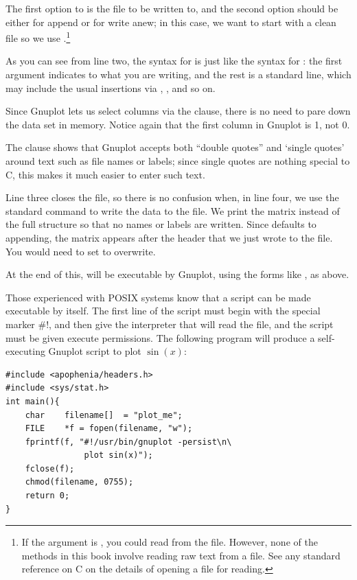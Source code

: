 The first option to  is the file to be written to, and
the second option should be either  for append or  for
write anew; in this case, we want to start with a clean file so we use
.\footnote{If the argument is , you could read from the
file. However, none of the methods in this book involve reading raw text
from a file. See any standard reference on C on the details of opening a
file for reading.} 


As you can see from line two, the syntax for  is just like
the syntax for : the first argument indicates to what you
are writing, and the rest is a standard  line, which may
include the usual insertions via , , and so on.

Since Gnuplot lets us select columns via the  clause, there
is no need to pare down the data set in memory.  Notice again that the
first column in Gnuplot is 1, not 0.

The  clause shows that Gnuplot accepts both ``double quotes''
and `single quotes' around text such as file names or labels; since
single quotes are nothing special to C, this makes it much easier to
enter such text.

Line three closes the file, so there is no confusion when, in line four,
we use the standard  command to write the data
to the file. We print the matrix instead of the
full  structure so that no names or labels are written.
Since  defaults to appending, the matrix appears
after the  header that we just wrote to the file.
You would need to set  to overwrite.

At the end of this,  will be executable by
Gnuplot, using the forms like 
, as above.

\treesymbol{} Those experienced with POSIX systems know that a script
can be made executable by itself. The first line of the script must begin
with the special marker \#!, and then give the interpreter that will read
the file, and the script must be given execute permissions. The following
program will produce a self-executing Gnuplot script to plot $\sin(x)$:
\begin{lstlisting}
#include <apophenia/headers.h>
#include <sys/stat.h>
int main(){
    char    filename[]  = "plot_me";
    FILE    *f = fopen(filename, "w");
    fprintf(f, "#!/usr/bin/gnuplot -persist\n\
                plot sin(x)");
    fclose(f);
    chmod(filename, 0755);
    return 0;
}
\end{lstlisting}

